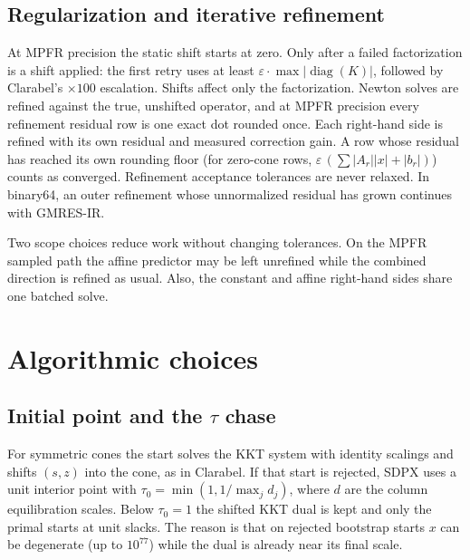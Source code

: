 \documentclass[11pt]{article}
\newcommand{\eps}{\varepsilon}
\begin{document}
\subsection{Regularization and iterative refinement}

At MPFR precision the static shift starts at zero. Only after a failed
factorization is a shift applied: the first retry uses at least
$\eps\cdot\max|\operatorname{diag}(K)|$, followed by Clarabel's $\times100$
escalation. Shifts affect only the factorization. Newton solves are refined
against the true, unshifted operator, and at MPFR precision every refinement
residual row is one exact dot rounded once. Each right-hand side is refined
with its own residual and measured correction gain. A row whose residual has
reached its own rounding floor (for zero-cone rows,
$\eps\,(\sum|A_r||x| + |b_r|)$) counts as converged. Refinement acceptance
tolerances are never relaxed. In binary64, an outer refinement whose
unnormalized residual has grown continues with GMRES-IR.

Two scope choices reduce work without changing tolerances. On the MPFR
sampled path the affine predictor may be left unrefined while the combined
direction is refined as usual. Also, the constant and affine right-hand sides
share one batched solve.

\section{Algorithmic choices}
\label{sec:algo}

\subsection{\texorpdfstring{Initial point and the $\tau$ chase}{Initial point and the tau chase}}
\label{sec:start}

For symmetric cones the start solves the KKT system with identity scalings and
shifts $(s,z)$ into the cone, as in Clarabel. If that start is rejected, SDPX
uses a unit interior point with $\tau_0 = \min(1, 1/\max_j d_j)$, where $d$
are the column equilibration scales. Below $\tau_0 = 1$ the shifted KKT dual is
kept and only the primal starts at unit slacks. The reason is that on rejected
bootstrap starts $x$ can be degenerate (up to $10^{77}$) while the dual is
already near its final scale.
\end{document}
